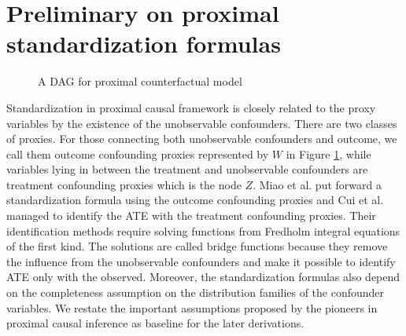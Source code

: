 \section{Preliminary on proximal standardization formulas}

\begin{figure}[ht]
    \centering
    \caption{\centering A DAG for proximal counterfactual model}
    \label{fig: pre_dagprox}
\end{figure}

Standardization in proximal causal framework is closely related to the proxy variables by the existence of the unobservable confounders. 
There are two classes of proxies. 
For those connecting both unobservable confounders and outcome, we call them outcome confounding proxies represented by $W$ in Figure \ref{fig: pre_dagprox}, 
while variables lying in between the treatment and unobservable confounders are treatment confounding proxies which is the node $Z$. 
Miao et al.\cite{WMiao2018} put forward a standardization formula using the outcome confounding proxies 
and Cui et al.\cite{YFCui2023} managed to identify the ATE with the treatment confounding proxies. 
Their identification methods require solving functions from Fredholm integral equations of the first kind. 
The solutions are called bridge functions because 
they remove the influence from the unobservable confounders 
and make it possible to identify ATE only with the observed. 
Moreover, the standardization formulas also depend on the completeness assumption on the distribution families of the confounder variables. 
We restate the important assumptions proposed by the pioneers in proximal causal inference as baseline for the later derivations.

